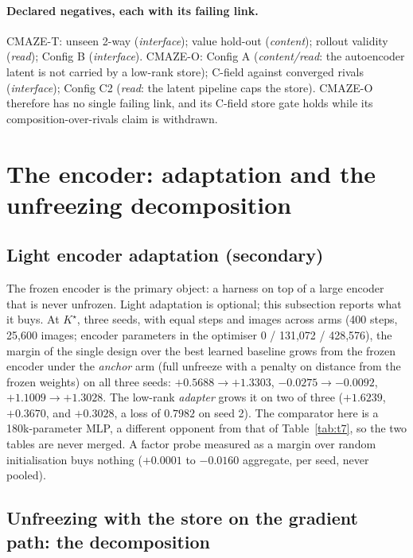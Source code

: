 \documentclass{article} %
\newcommand{\Kstar}{\ensuremath{K^{\star}}}
\begin{document}
\paragraph{Declared negatives, each with its failing link.} CMAZE-T: unseen 2-way
(\emph{interface}); value hold-out (\emph{content}); rollout validity (\emph{read}); Config B
(\emph{interface}). CMAZE-O: Config A (\emph{content/read}: the autoencoder latent is not carried by
a low-rank store); C-field against converged rivals (\emph{interface}); Config C2 (\emph{read}: the
latent pipeline caps the store). CMAZE-O therefore has no single failing link, and its C-field
store gate holds while its composition-over-rivals claim is withdrawn.

\section{The encoder: adaptation and the unfreezing decomposition}
\label{app:encoder-main}

\subsection*{Light encoder adaptation (secondary)}

The frozen encoder is the primary object: a harness on top of a large encoder that is never
unfrozen. Light adaptation is optional; this subsection reports what it buys. At $\Kstar$, three
seeds, with equal steps and images across arms (400 steps, 25,600 images; encoder parameters in the
optimiser 0 / 131,072 / 428,576), the margin of the single design over the best learned
baseline grows from the frozen encoder under the \emph{anchor} arm (full unfreeze with a
penalty on distance from the frozen weights) on all three seeds: $+0.5688\to+1.3303$,
$-0.0275\to-0.0092$, $+1.1009\to+1.3028$. The low-rank \emph{adapter} grows it on two of
three ($+1.6239$, $+0.3670$, and $+0.3028$, a loss of $0.7982$ on seed 2).
The comparator here is a 180k-parameter MLP, a different opponent from that of
Table~\ref{tab:t7}, so the two tables are never merged. A factor probe measured as a margin over
random initialisation buys nothing ($+0.0001$ to $-0.0160$ aggregate, per seed, never pooled).

\subsection*{Unfreezing with the store on the gradient path: the decomposition}
\end{document}
